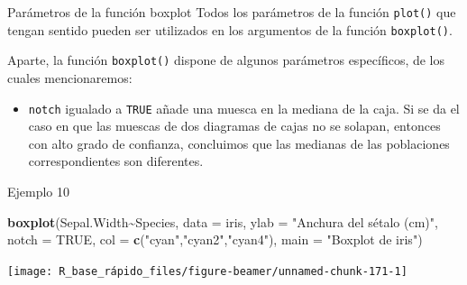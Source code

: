 \documentclass[
  ignorenonframetext,
  aspectratio=169]{beamer}
\newenvironment{Shaded}{\begin{snugshade}}{\end{snugshade}}
\newcommand{\AttributeTok}[1]{\textcolor[rgb]{0.13,0.29,0.53}{#1}}
\newcommand{\ConstantTok}[1]{\textcolor[rgb]{0.56,0.35,0.01}{#1}}
\newcommand{\FunctionTok}[1]{\textcolor[rgb]{0.13,0.29,0.53}{\textbf{#1}}}
\newcommand{\NormalTok}[1]{#1}
\newcommand{\SpecialCharTok}[1]{\textcolor[rgb]{0.81,0.36,0.00}{\textbf{#1}}}
\newcommand{\StringTok}[1]{\textcolor[rgb]{0.31,0.60,0.02}{#1}}
\providecommand{\tightlist}{%
  \setlength{\itemsep}{0pt}\setlength{\parskip}{0pt}}
\begin{document}
\begin{frame}[fragile]{Parámetros de la función boxplot}
\label{paruxe1metros-de-la-funciuxf3n-boxplot}
Todos los parámetros de la función \texttt{plot()} que tengan sentido
pueden ser utilizados en los argumentos de la función
\texttt{boxplot()}.

Aparte, la función \texttt{boxplot()} dispone de algunos parámetros
específicos, de los cuales mencionaremos:

\begin{itemize}
\tightlist
\item
  \texttt{notch} igualado a \texttt{TRUE} añade una muesca en la mediana
  de la caja. Si se da el caso en que las muescas de dos diagramas de
  cajas no se solapan, entonces con alto grado de confianza, concluimos
  que las medianas de las poblaciones correspondientes son diferentes.
\end{itemize}
\end{frame}

\begin{frame}[fragile]{Ejemplo 10}
\label{ejemplo-10}
\begin{Shaded}
\begin{Highlighting}[]
\FunctionTok{boxplot}\NormalTok{(Sepal.Width}\SpecialCharTok{\textasciitilde{}}\NormalTok{Species, }\AttributeTok{data =}\NormalTok{ iris, }\AttributeTok{ylab =} \StringTok{"Anchura del sétalo (cm)"}\NormalTok{,}
        \AttributeTok{notch =} \ConstantTok{TRUE}\NormalTok{, }\AttributeTok{col =} \FunctionTok{c}\NormalTok{(}\StringTok{"cyan"}\NormalTok{,}\StringTok{"cyan2"}\NormalTok{,}\StringTok{"cyan4"}\NormalTok{),}
        \AttributeTok{main =} \StringTok{"Boxplot de iris"}\NormalTok{)}
\end{Highlighting}
\end{Shaded}

\begin{center}\texttt{[image: R\_base\_rápido\_files/figure-beamer/unnamed-chunk-171-1]} \end{center}
\end{frame}
\end{document}
